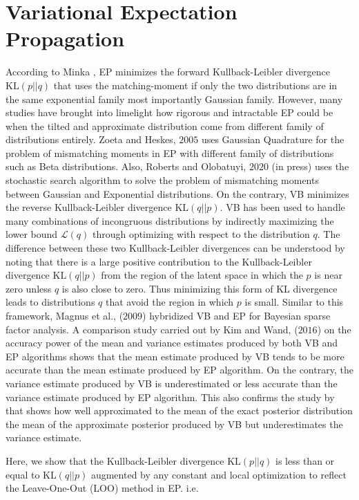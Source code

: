 \documentclass[]{article}
\begin{document}
\section{Variational Expectation Propagation}
According to Minka \cite{minka2005ep}, EP minimizes the forward Kullback-Leibler divergence $\text{KL}(p||q)$ that uses the matching-moment if only the two distributions are in the same exponential family most importantly Gaussian family. However, many studies have brought into limelight how rigorous and intractable EP could be when the tilted and approximate distribution come from different family of distributions entirely. Zoeta and Heskes, $2005$ uses Gaussian Quadrature for the problem of mismatching moments in EP with different family of distributions such as Beta distributions. Also, Roberts and Olobatuyi, $2020$ (in press) uses the stochastic search algorithm to solve the problem of mismatching moments between Gaussian and Exponential distributions. On the contrary, VB minimizes the reverse Kullback-Leibler divergence $\text{KL}(q||p)$. VB has been used to handle many combinations of incongruous distributions by indirectly maximizing the lower bound $\mathcal{L}(q)$ through optimizing with respect to the distribution $q$. The difference between these two Kullback-Leibler divergences can be understood by noting that there is a large positive contribution to the Kullback-Leibler divergence $\text{KL}(q||p)$ from the region of the latent space in which the $p$ is near zero unless $q$ is also close to zero. Thus minimizing this form of KL divergence leads to distributions $q$ that avoid the region in which $p$ is small. Similar to this framework, Magnus et al., ($2009$) hybridized VB and EP for Bayesian sparse factor analysis. A comparison study carried out by Kim and Wand, ($2016$) on the accuracy power of the mean and variance estimates produced by both VB and EP algorithms shows that the mean estimate produced by VB tends to be more accurate than the mean estimate produced by EP algorithm. On the contrary, the variance estimate produced by VB is underestimated or less accurate than the variance estimate produced by EP algorithm. This also confirms the study by \cite{bishop2006} that shows how well approximated to the mean of the exact posterior distribution the mean of the approximate posterior produced by VB but underestimates the variance estimate. \par Here, we show that the Kullback-Leibler divergence $\text{KL}(p||q)$ is less than or equal to $\text{KL}(q||p)$ augmented by any constant and local optimization to reflect the Leave-One-Out (LOO) method in EP. i.e. 
\end{document}
